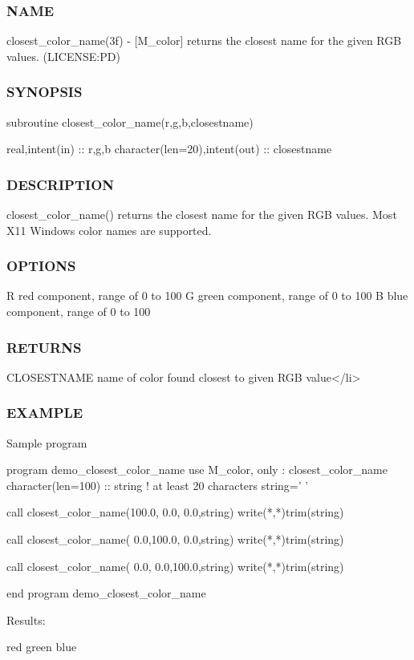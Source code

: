 \subsubsection*{N\+A\+ME}

closest\+\_\+color\+\_\+name(3f) -\/ \mbox{[}M\+\_\+color\mbox{]} returns the closest name for the given R\+GB values. (L\+I\+C\+E\+N\+SE\+:PD) \subsubsection*{S\+Y\+N\+O\+P\+S\+IS}

subroutine closest\+\_\+color\+\_\+name(r,g,b,closestname)

real,intent(in) \+:\+: r,g,b character(len=20),intent(out) \+:\+: closestname \subsubsection*{D\+E\+S\+C\+R\+I\+P\+T\+I\+ON}

\begin{DoxyVerb} closest_color_name() returns the closest name for the given RGB values.
 Most X11 Windows color names are supported.
\end{DoxyVerb}


\subsubsection*{O\+P\+T\+I\+O\+NS}

\begin{DoxyVerb} R   red component, range of 0 to 100
 G   green component, range of 0 to 100
 B   blue component, range of 0 to 100
\end{DoxyVerb}


\subsubsection*{R\+E\+T\+U\+R\+NS}

\begin{DoxyVerb} CLOSESTNAME   name of color found closest to given RGB value</li>
\end{DoxyVerb}


\subsubsection*{E\+X\+A\+M\+P\+LE}

\begin{DoxyVerb}Sample program

    program demo_closest_color_name
    use M_color, only : closest_color_name
    character(len=100) :: string ! at least 20 characters
    string=' '

    call closest_color_name(100.0,  0.0,  0.0,string)
    write(*,*)trim(string)

    call closest_color_name(  0.0,100.0,  0.0,string)
    write(*,*)trim(string)

    call closest_color_name(  0.0,  0.0,100.0,string)
    write(*,*)trim(string)

    end program demo_closest_color_name

Results:

    red
    green
    blue
\end{DoxyVerb}
